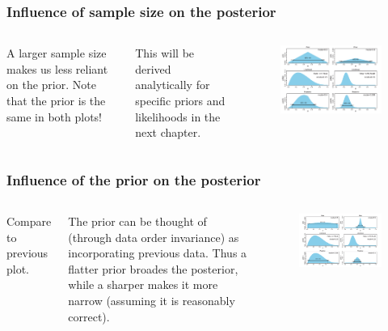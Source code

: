 \documentclass[usenames,dvipsnames,table]{beamer}
\begin{document}
\begin{frame}
\frametitle{Influence of sample size on the posterior}
\begin{columns}[c]
A larger sample size makes us less reliant on the prior. Note that the prior is the same in both plots!

This will be derived analytically for specific priors and likelihoods in the next chapter.

\begin{figure}
\centering
\includegraphics[width=\linewidth]{img/fig5_2}
\end{figure}
\end{columns}
\end{frame}

\begin{frame}
\frametitle{Influence of the prior on the posterior}
\begin{columns}[c]
Compare to previous plot.

The prior can be thought of (through data order invariance) as incorporating previous data. Thus a flatter prior broades the posterior, while a sharper makes it more narrow (assuming it is reasonably correct).

\begin{figure}
\centering
\includegraphics[width=\linewidth]{img/fig5_3}
\end{figure}
\end{columns}
\end{frame}
\end{document}
